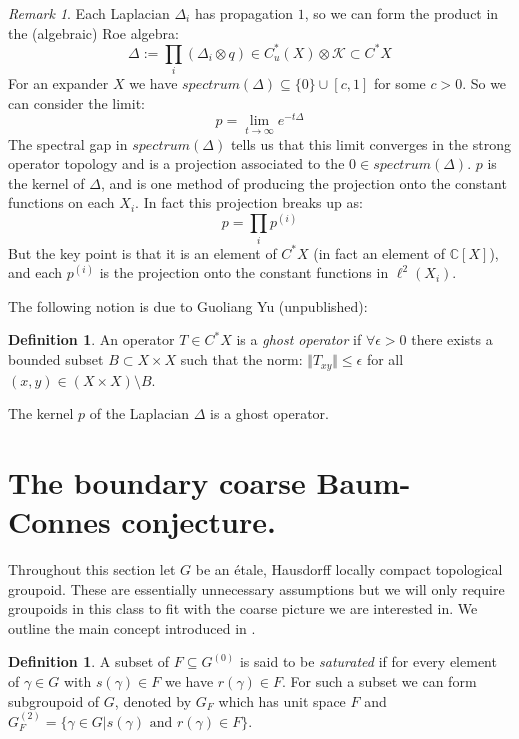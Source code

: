 \documentclass[11pt]{amsart}
\theoremstyle{plain}
\theoremstyle{definition}%
\newtheorem{definition}[theorem]{Definition}%
\theoremstyle{remark}%
\newtheorem{remark}[theorem]{Remark}%
\begin{document}
\begin{remark}\label{Rem:Ghost}
Each Laplacian $\Delta_{i}$ has propagation $1$, so we can form the product in the (algebraic) Roe algebra:
\begin{equation*}
\Delta:=\prod_{i}(\Delta_{i} \otimes q) \in C^{*}_{u}(X)\otimes \mathcal{K} \subset C^{*}X
\end{equation*}
For an expander $X$ we have $spectrum(\Delta) \subseteq \lbrace 0 \rbrace \cup [c,1]$ for some $c>0$. So we can consider the limit:
\begin{equation*}
p = \lim_{t \rightarrow \infty}e^{-t\Delta}
\end{equation*}
The spectral gap in $spectrum(\Delta)$ tells us that this limit converges in the strong operator topology and is a projection associated to the $0 \in spectrum(\Delta)$. $p$ is the kernel of $\Delta$, and is one method of producing the projection onto the constant functions on each $X_{i}$. In fact this projection breaks up as:
\begin{equation*}
p=\prod_{i}p^{(i)}
\end{equation*}
But the key point is that it is an element of $C^{*}X$ (in fact an element of $\mathbb{C}[X]$), and each $p^{(i)}$ is the projection onto the constant functions in $\ell^{2}(X_{i})$. 
\end{remark}
The following notion is due to Guoliang Yu (unpublished):

\begin{definition}\label{Def:Ghost}
An operator $T \in C^{*}X$ is a \textit{ghost operator} if $\forall \epsilon >0$ there exists a bounded subset $B \subset X\times X$ such that the norm: $\Vert T_{xy} \Vert \leq \epsilon$ for all $(x,y) \in (X\times X) \setminus B$.
\end{definition}

The kernel $p$ of the Laplacian $\Delta$ is a ghost operator.

\section{The boundary coarse Baum-Connes conjecture.}\label{Sect:CE}

Throughout this section let $G$ be an \'etale, Hausdorff locally compact topological groupoid. These are essentially unnecessary assumptions but we will only require groupoids in this class to fit with the coarse picture we are interested in. We outline the main concept introduced in \cite{MR1911663}. 

\begin{definition}
A subset of $F\subseteq G^{(0)}$ is said to be \textit{saturated} if for every element of $\gamma \in G$ with $s(\gamma) \in F$ we have $r(\gamma) \in F$. For such a subset we can form subgroupoid of $G$, denoted by $G_{F}$ which has unit space $F$ and $G_{F}^{(2)}=\lbrace \gamma \in G | s(\gamma) \mbox{ and } r(\gamma) \in F \rbrace$.
\end{definition}
\end{document}
